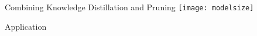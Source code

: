 \begin{frame}{Combining Knowledge Distillation and Pruning}
\air
\air
\centering
\texttt{[image: modelsize]}
\end{frame}


\begin{frame}{Application}

  \begin{center}
  \end{center}
\end{frame}

